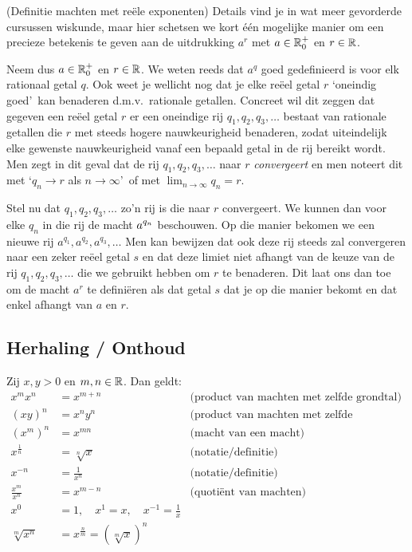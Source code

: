 \documentclass{ximera}
\begin{document}
\begin{xmuitweiding} (Definitie machten met reële exponenten) \label{machten-r}
Details vind je in wat meer gevorderde cursussen wiskunde, maar hier schetsen we kort \'{e}\'{e}n mogelijke manier om een precieze betekenis te geven
aan de uitdrukking $a^r$ met $a\in\mathbb{R}_0^+$ en $r\in\mathbb{R}$.

Neem dus $a\in\mathbb{R}_0^+$ en $r\in\mathbb{R}$. We weten reeds dat $a^q$
goed gedefinieerd is voor elk rationaal getal $q$. Ook weet je
wellicht nog dat je elke re\"eel getal $r$ \lq oneindig goed\rq\
kan benaderen d.m.v.~rationale getallen. Concreet wil dit zeggen
dat gegeven een re\"eel getal $r$ er een oneindige rij
$q_1,q_2,q_3,\ldots$ bestaat van rationale getallen die $r$ met
steeds hogere nauwkeurigheid benaderen, zodat uiteindelijk elke
gewenste nauwkeurigheid vanaf een bepaald getal in de rij bereikt
wordt. Men zegt in dit geval dat de rij $q_1,q_2,q_3,\ldots$ naar
$r$ \emph{convergeert} en men noteert dit met \lq $q_n\to r$ als
$n\to\infty$\rq\ of met $\lim_{n\to\infty}q_n=r$.

Stel nu dat $q_1,q_2,q_3,\ldots$ zo'n rij is die naar $r$
convergeert. We kunnen dan voor elke $q_n$ in die rij de macht
$\displaystyle a^{q_n}$ beschouwen. Op die manier bekomen we een nieuwe rij
$a^{q_1},a^{q_2},a^{q_3},\ldots$ 	
Men kan bewijzen dat ook deze rij steeds
zal convergeren naar een zeker re\"eel getal $s$ en dat deze
limiet niet afhangt van de keuze van de rij $q_1,q_2,q_3,\ldots$
die we gebruikt hebben  om $r$ te benaderen. Dit laat ons dan toe
om de macht $a^r$ te defini\"eren als dat getal $s$ dat je op die
manier bekomt en dat enkel afhangt van $a$ en $r$.
\end{xmuitweiding}




\subsection{Herhaling / Onthoud }\label{samenvatting:rekenregels machten}

\begin{proposition}
Zij $x,y>0$ en $m,n\in\mathbb{R}$. Dan geldt:
\begin{align*}
	x^{m}x^{n}          &= x^{m+n}     & \text{(product van machten met zelfde grondtal)}\\
	(xy)^n              &= x^ny^n      & \text{(product van machten met zelfde exponent)}\\
	\left(x^{m}\right)^{n}&= x^{mn}    & \text{(macht van een macht)}\\	
	x^{\frac1n} &= \sqrt[n] x          & \text{(notatie/definitie)}\\
	x^{-n}          &= \frac{1}{x^n}  & \text{(notatie/definitie)}\\
	\frac{x^{m}}{x^{n}} &= x^{m-n}      & \text{(quotiënt van machten)} \\
	x^0&=1, \quad x^1=x, \quad x^{-1}=\frac1x \\
	\sqrt[m]{x^n} & = x^{\frac{n}{m}} = (\sqrt[m]{x})^n
\end{align*}
\end{proposition}
\end{document}
